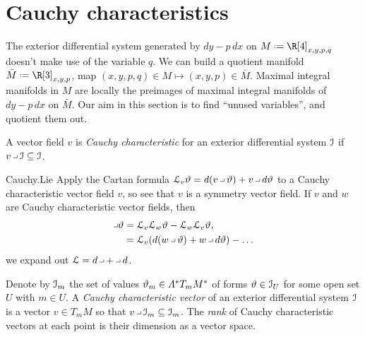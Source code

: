 \section{Cauchy characteristics}
\begin{example}
The exterior differential system generated by \(dy-p \, dx\) on \(M\defeq \R[4]_{x,y,p,q}\) doesn't make use of the variable \(q\).
We can build a quotient manifold \(\bar{M}\defeq \R[3]_{x,y,p}\), map \((x,y,p,q) \in M \mapsto (x,y,p) \in \bar{M}\). 
Maximal integral manifolds in \(M\) are locally the preimages of maximal integral manifolds of \(dy-p\, dx\) on \(\bar{M}\).
Our aim in this section is to find ``unused variables'', and quotient them out.
\end{example}
A vector field \(v\) is \emph{Cauchy characteristic} for an exterior differential system \(\mathcal{I}\) if \(v \hook \II \subseteq \II\). 
%
\begin{answer}{Cauchy.Lie}%
Apply the Cartan formula \(\LieDer_v \vartheta = d(v \hook \vartheta) + v \hook d\vartheta\) to a Cauchy characteristic vector field \(v\), so see that \(v\) is a symmetry vector field.
If \(v\) and \(w\) are Cauchy characteristic vector fields, then 
\begin{align*}
[v,w] \hook \vartheta
&=
\LieDer_v \LieDer_w \vartheta 
- 
\LieDer_w \LieDer_v \vartheta 
,
\\
&=
\LieDer_v (d(w \hook \vartheta)+w \hook d\vartheta)
-
\dots
\end{align*}
we expand out \(\LieDer = d \hook + \hook d\).%
\end{answer}
Denote by \(\mathcal{I}_m\) the set of values \(\vartheta_m\in \Lm{*}{T_m M}^*\) of forms \(\vartheta \in \mathcal{I}_U\) for some open set \(U\) with \(m \in U\).
A \emph{Cauchy characteristic vector} of an exterior differential system \(\mathcal{I}\) is a vector \(v\in T_m M\) so that \(v \hook \II_m \subseteq \II_m\). 
The \emph{rank} of Cauchy characteristic vectors at each point is their dimension as a vector space.
